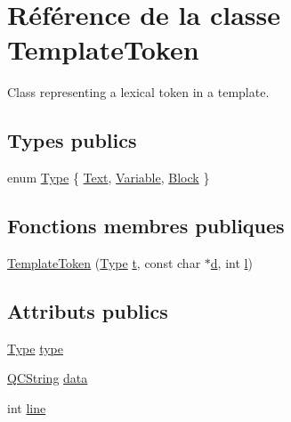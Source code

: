 \hypertarget{class_template_token}{}\section{Référence de la classe Template\+Token}
\label{class_template_token}


Class representing a lexical token in a template.  


\subsection*{Types publics}
\begin{DoxyCompactItemize}
\item 
enum \hyperlink{class_template_token_a45cf31d317b7b01b08e7d0b471284e77}{Type} \{ \hyperlink{class_template_token_a45cf31d317b7b01b08e7d0b471284e77a751b09b335072516710adf86afee4fba}{Text}, 
\hyperlink{class_template_token_a45cf31d317b7b01b08e7d0b471284e77a311bd7bdbe5632cb06a97793ac88b1c7}{Variable}, 
\hyperlink{class_template_token_a45cf31d317b7b01b08e7d0b471284e77a3d3969430e128ce00118a708306518cb}{Block}
 \}
\end{DoxyCompactItemize}
\subsection*{Fonctions membres publiques}
\begin{DoxyCompactItemize}
\item 
\hyperlink{class_template_token_a45e8323438c1c810948f34f7033aafdf}{Template\+Token} (\hyperlink{class_template_token_a45cf31d317b7b01b08e7d0b471284e77}{Type} \hyperlink{058__bracket__recursion_8tcl_a69e959f6901827e4d8271aeaa5fba0fc}{t}, const char $\ast$\hyperlink{060__command__switch_8tcl_af43f4b1f0064a33b2d662af9f06d3a00}{d}, int \hyperlink{060__command__switch_8tcl_aff56f84b49947b84b2a304f51cf8e678}{l})
\end{DoxyCompactItemize}
\subsection*{Attributs publics}
\begin{DoxyCompactItemize}
\item 
\hyperlink{class_template_token_a45cf31d317b7b01b08e7d0b471284e77}{Type} \hyperlink{class_template_token_a470cd07c2d8ec16824e5c920a984b268}{type}
\item 
\hyperlink{class_q_c_string}{Q\+C\+String} \hyperlink{class_template_token_a712ae507076c9b03b88f72174a817a44}{data}
\item 
int \hyperlink{class_template_token_a44271a10cbc74eea133ed9e92897012e}{line}
\end{DoxyCompactItemize}


